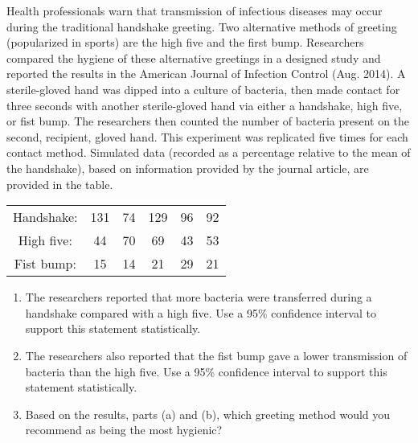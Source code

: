 
\begin{exercise}

    Health professionals warn that transmission of infectious diseases may occur during the
    traditional handshake greeting. Two alternative methods of greeting (popularized in sports)
    are the high five and the first bump. Researchers compared the hygiene of these alternative
    greetings in a designed study and reported the results in the American Journal of Infection
    Control (Aug. 2014). A sterile-gloved hand was dipped into a culture of bacteria, then made
    contact for three seconds with another sterile-gloved hand via either a handshake, high five,
    or fist bump. The researchers then counted the number of bacteria present on the second,
    recipient, gloved hand. This experiment was replicated five times for each contact method.
    Simulated data (recorded as a percentage relative to the mean of the handshake), based on
    information provided by the journal article, are provided in the table.

    \begin{center}
        \begin{tabular}{c c c c c c}
            Handshake: & 131 & 74 & 129 & 96 & 92 \\
            High five: & 44 & 70 & 69 & 43 & 53 \\
            Fist bump: & 15 & 14 & 21 & 29 & 21
        \end{tabular}
    \end{center}


    \begin{enumerate}[label = (\alph*)]
        \item The researchers reported that more bacteria were transferred
        during a handshake compared with a high five. Use a 95\% confidence interval to support this statement statistically.
        \item The researchers also reported that the fist bump gave a lower transmission
        of bacteria than the high five. Use a 95\% confidence interval to support this statement statistically.
        \item Based on the results, parts (a) and (b), which greeting method would you
        recommend as being the most hygienic?
    \end{enumerate}

\end{exercise}


